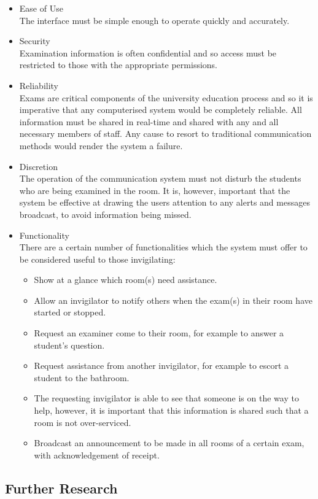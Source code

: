 \begin{itemize}
\item Ease of Use\\
The interface must be simple enough to operate quickly and accurately.
\item Security\\
Examination information is often confidential and so access must be restricted to those  with the appropriate permissions.
\item Reliability\\
Exams are critical components of the university education process and so it is imperative that any computerised system would be completely reliable.  All information must be shared in real-time and shared with any and all necessary members of staff.  Any cause to resort to traditional communication methods would render the system a failure.
\item Discretion\\
The operation of the communication system must not disturb the students who are being examined in the room.  It is, however, important that the system be effective at drawing the users attention to any alerts and messages broadcast, to avoid information being missed.
\item Functionality\\
There are a certain number of functionalities which the system must offer to be considered useful to those invigilating:

\begin{itemize}
\item Show at a glance which room(s) need assistance.
\item Allow an invigilator to notify others when the exam(s) in their room have started or stopped.
\item Request an examiner come to their room, for example to answer a student's question.
\item Request assistance from another invigilator, for example to escort a student to the bathroom.
\item The requesting invigilator is able to see that someone is on the way to help, however, it is important that this information is shared such that a room is not over-serviced.
\item Broadcast an announcement to be made in all rooms of a certain exam, with acknowledgement of receipt.
\end{itemize}
\end{itemize}

\subsection{Further Research}

